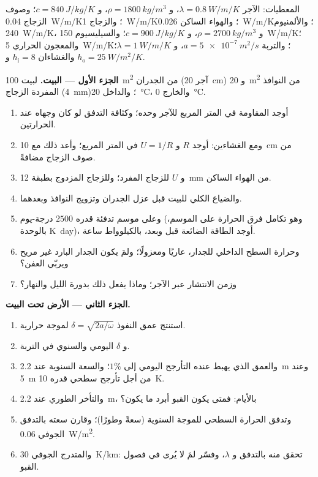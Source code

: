 \begin{problem}\label{pb:b2:heat-conduction:1}
المعطيات: الآجر $\lambda = \qty{0.8}{W/m/K}$، و $\rho = \qty{1800}{kg/m^3}$، و $c =
\qty{840}{J/kg/K}$؛ وصوف الزجاج \qty{0.04}{W/m/K}؛ والزجاج \qty{1}{W/m/K}؛ والهواء
الساكن \qty{0.026}{W/m/K}؛ والألمنيوم \qty{240}{W/m/K}، و $\rho = \qty{2700}{kg/m^3}$،
و $c = \qty{900}{J/kg/K}$؛ والسيليسيوم \qty{150}{W/m/K}؛ والمعجون الحراري
\qty{5}{W/m/K}؛ والتربة $a = \qty{5e-7}{m^2/s}$، و $\lambda = \qty{1}{W/m/K}$؛
والغشاءان $h_{\text{i}} = 8$ و $h_{\text{o}} = \qty{25}{W/m^2/K}$.

\textbf{الجزء الأول --- البيت.}
لبيت \qty{100}{m^2} من الجدران (آجر \qty{20}{cm}) و \qty{20}{m^2}
من النوافذ المفردة الزجاج (\qty{4}{mm})؛ والداخل \qty{20}{\celsius}،
والخارج \qty{0}{\celsius}.
\begin{enumerate}
  \item أوجد المقاومة في المتر المربع للآجر وحده؛ وكثافة التدفق
        لو كان وجهاه عند الحرارتين.
  \item ومع الغشاءين: أوجد $R$ و $U = 1/R$ في المتر المربع؛ وأعد ذلك
        مع \qty{10}{cm} من صوف الزجاج مضافةً.
  \item و $U$ للزجاج المفرد؛ وللزجاج المزدوج بطبقة \qty{12}{mm}
        من الهواء الساكن.
  \item والضياع الكلي للبيت قبل عزل الجدران وتزويج النوافذ
        وبعدهما.
  \item وعلى موسم تدفئة قدره $2500$ درجة-يوم (وهو تكامل
        فرق الحرارة على الموسم، بالوحدة \unit{K.day})،
        أوجد الطاقة الضائعة قبل وبعد، بالكيلوواط ساعة.
  \item وحرارة السطح الداخلي للجدار، عاريًا ومعزولًا؛
        ولمَ يكون الجدار البارد غير مريح ويربّي العفن؟
  \item وزمن الانتشار عبر الآجر؛ وماذا يفعل ذلك بدورة
        الليل والنهار؟
\end{enumerate}

\textbf{الجزء الثاني --- الأرض تحت البيت.}
\begin{enumerate}[resume]
  \item استنتج عمق النفوذ $\delta = \sqrt{2a/\omega}$ لموجة
        حرارية.
  \item و $\delta$ اليومي والسنوي في التربة.
  \item والعمق الذي يهبط عنده التأرجح اليومي إلى $1\%$؛ والسعة
        السنوية عند \qty{2.2}{m} وعند \qty{5}{m} من أجل تأرجح سطحي
        قدره \qty{10}{K}.
  \item والتأخر الطوري عند \qty{2.2}{m}، بالأيام: فمتى يكون القبو أبرد ما يكون؟
  \item وتدفق الحرارة السطحي للموجة السنوية (سعةً وطورًا)؛
        وقارن سعته بالتدفق الجوفي \qty{0.06}{W/m^2}.
  \item والمتدرج الجوفي \qty{30}{K/km}: تحقق منه بالتدفق
        و $\lambda$، وفسّر لمَ لا يُرى في
        فصول القبو.
\end{enumerate}


\end{problem}
